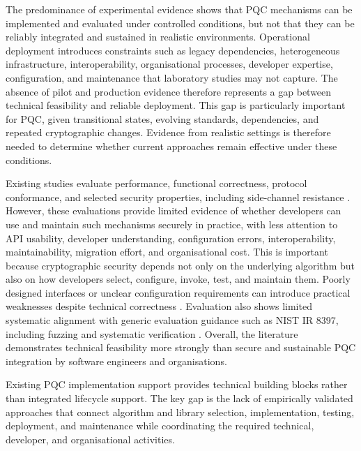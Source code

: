 \documentclass[letterpaper,twocolumn,10pt]{article}
\begin{document}
The predominance of experimental evidence shows that PQC mechanisms can be implemented and evaluated under controlled conditions, but not that they can be reliably integrated and sustained in realistic environments. Operational deployment introduces constraints such as legacy dependencies, heterogeneous infrastructure, interoperability, organisational processes, developer expertise, configuration, and maintenance that laboratory studies may not capture. The absence of pilot and production evidence therefore represents a gap between technical feasibility and reliable deployment. This gap is particularly important for PQC, given transitional states, evolving standards, dependencies, and repeated cryptographic changes. Evidence from realistic settings is therefore needed to determine whether current approaches remain effective under these conditions.

Existing studies evaluate performance, functional correctness, protocol conformance, and selected security properties, including side-channel resistance \cite{Ana_decisionAlgo, Ana_huelsing2021wireguard, Ana_tsili_scalable_2025, Ana_e27020212, Ana_hekkala_implementing_2023, Ana_PQCLeo25}. However, these evaluations provide limited evidence of whether developers can use and maintain such mechanisms securely in practice, with less attention to API usability, developer understanding, configuration errors, interoperability, maintainability, migration effort, and organisational cost. This is important because cryptographic security depends not only on the underlying algorithm but also on how developers select, configure, invoke, test, and maintain them. Poorly designed interfaces or unclear configuration requirements can introduce practical weaknesses despite technical correctness \cite{toruan2026security}. Evaluation also shows limited systematic alignment with generic evaluation guidance such as NIST IR 8397, including fuzzing and systematic verification \cite{nist_ir_8397_2021}. Overall, the literature demonstrates technical feasibility more strongly than secure and sustainable PQC integration by software engineers and organisations.

\begin{tcolorbox}[
title=\textbf{Takeaway},
colback=gray!5,
colframe=black,
boxrule=0.5pt,
arc=0.5mm,
left=0.5mm,
right=0.5mm,
top=0.5mm,
bottom=0.5mm
]
Existing PQC implementation support provides technical building blocks rather than integrated lifecycle support. The key gap is the lack of empirically validated approaches that connect algorithm and library selection, implementation, testing, deployment, and maintenance while coordinating the required technical, developer, and organisational activities.
\end{tcolorbox}
\end{document}
